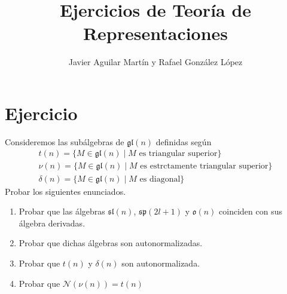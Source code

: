 \documentclass[twoside]{article}
\begin{document}
\title{Ejercicios de Teoría de Representaciones}
\author{Javier Aguilar Martín y Rafael González López}
\maketitle

\section{Ejercicio}
\begin{ejercicio}{1}
Consideremos las subálgebras de $\mathfrak{gl}(n)$ definidas según
\begin{gather*}
t(n) = \{ M \in \mathfrak{gl}(n) \mid M\text{ es triangular superior}\}
\\
\nu(n) = \{ M \in \mathfrak{gl}(n) \mid M\text{ es estrctamente triangular superior}\}\\
\delta(n) = \{ M \in \mathfrak{gl}(n) \mid M\text{ es diagonal}\}
\end{gather*}
Probar los siguientes enunciados.
\begin{enumerate}
\item Probar que las álgebras $\mathfrak{sl}(n)$, $\mathfrak{sp}(2l+1)$ y $\mathfrak{o}(n)$ coinciden con sus álgebra derivadas.
\item Probar que dichas álgebras son autonormalizadas.
\item Probar que $t(n)$ y $\delta(n)$ son autonormalizada.
\item Probar que $\mathcal{N}(\nu(n)) = t(n)$
\end{enumerate}
\end{ejercicio}
\end{document}
